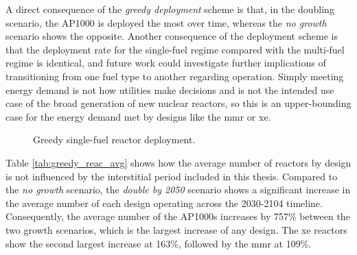 A direct consequence of the \textit{greedy deployment} scheme is that, in the doubling scenario, the AP1000 is deployed the most over time, whereas the \textit{no growth} scenario shows the opposite. Another consequence of the deployment scheme is that the deployment rate for the single-fuel regime compared with the multi-fuel regime is identical, and future work could investigate further implications of transitioning from one fuel type to another regarding operation. Simply meeting energy demand is not how utilities make decisions and is not the intended use case of the broad generation of new nuclear reactors, so this is an upper-bounding case for the energy demand met by designs like the \gls{mmr} or \gls{xe}.


\begin{figure}[H]
  \hfill
  \caption{Greedy single-fuel reactor deployment.}
  \label{fig:greedy_of_reactors}
\end{figure}

Table \ref{tab:greedy_reac_avg} shows how the average number of reactors by design is not influenced by the interstitial period included in this thesis. Compared to the \textit{no growth} scenario, the \textit{double by 2050} scenario shows a significant increase in the average number of each design operating across the 2030-2104 timeline. Consequently, the average number of the AP1000s increases by 757\% between the two growth scenarios, which is the largest increase of any design. The \gls{xe} reactors show the second largest increase at 163\%, followed by the \gls{mmr} at 109\%.

